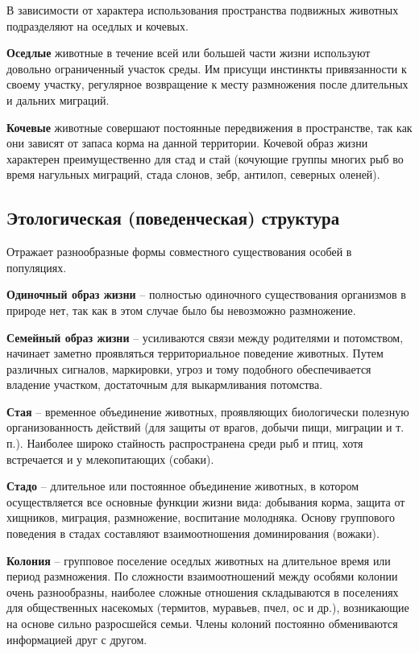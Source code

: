 \documentclass[a5paper, 11pt]{extarticle}
\theoremstyle{definition}
\theoremstyle{definition}
\theoremstyle{definition}
\numberwithin{figure}{section}
\begin{document}
В зависимости от характера использования пространства подвижных животных подразделяют на оседлых и кочевых.

\textbf{Оседлые} животные в течение всей или большей части жизни используют довольно ограниченный участок среды. Им присущи инстинкты привязанности к своему участку, регулярное возвращение к месту размножения после длительных и дальних миграций.

\textbf{Кочевые} животные совершают постоянные передвижения в пространстве, так как они зависят от запаса корма на данной территории. Кочевой образ жизни характерен преимущественно для стад и стай (кочующие группы многих рыб во время нагульных миграций, стада слонов, зебр, антилоп, северных оленей).

\subsection{Этологическая (поведенческая) структура}

Отражает разнообразные формы совместного существования особей в популяциях.

\textbf{Одиночный образ жизни} -- полностью одиночного существования организмов в природе нет, так как в этом случае было бы невозможно размножение.

\textbf{Семейный образ жизни} -- усиливаются связи между родителями и потомством, начинает заметно проявляться территориальное поведение животных. Путем различных сигналов, маркировки, угроз и тому подобного обеспечивается владение участком, достаточным для выкармливания потомства.

\textbf{Стая} -- временное объединение животных, проявляющих биологически полезную организованность действий (для защиты от врагов, добычи пищи, миграции и т. п.). Наиболее широко стайность распространена среди рыб и птиц, хотя встречается и у млекопитающих (собаки).

\textbf{Стадо} -- длительное или постоянное объединение животных, в котором осуществляется все основные функции жизни вида: добывания корма, защита от хищников, миграция, размножение, воспитание молодняка. Основу группового поведения в стадах составляют взаимоотношения доминирования (вожаки).

\textbf{Колония} -- групповое поселение оседлых животных на длительное время или период размножения. По сложности взаимоотношений между особями колонии очень разнообразны, наиболее сложные отношения складываются в поселениях для общественных насекомых (термитов, муравьев, пчел, ос и др.), возникающие на основе сильно разросшейся семьи. Члены колоний постоянно обмениваются информацией друг с другом.
\end{document}
